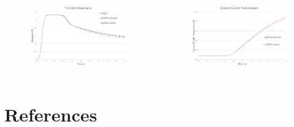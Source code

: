 \documentclass{beamer}
\begin{document}
\begin{frame}[fragile]
\begin{columns}[c]
\begin{figure}
\includegraphics[width=0.9\linewidth]{reactivity.png}
\end{figure}
\begin{figure}
\includegraphics[width=0.9\linewidth]{mtem.png}
\end{figure}

\end{columns}

\end{frame}

\section{References}
\end{document}
